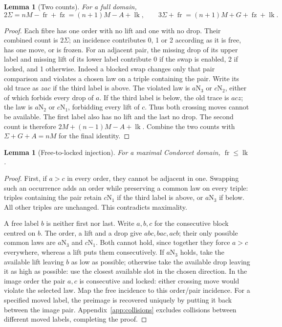 \documentclass[11pt,letterpaper]{article}
\newtheorem{lemma}[theorem]{Lemma}
\theoremstyle{definition}
\newcommand{\Sig}{\Sigma}
\newcommand{\fr}{\operatorname{fr}}
\newcommand{\fz}{\operatorname{fz}}
\newcommand{\lk}{\operatorname{lk}}
\newcommand{\N}[2]{#1\mathrm N_{#2}}
\begin{document}
\begin{lemma}[Two counts]\label{lem:counts}
For a full domain,
\begin{equation}\label{eq:movecounts}
 2\Sig=nM-\fr+\fz=(n+1)M-A+\lk,
 \qquad 3\Sig+\fr=(n+1)M+G+\fz+\lk.
\end{equation}
\end{lemma}
\begin{proof}
Each fibre has one order with no lift and one with no drop. Their
combined count is \(2\Sig\); an incidence contributes 0, 1 or 2
according as it is free, has one move, or is frozen.
For an adjacent pair, the missing drop of its upper label and missing
lift of its lower label contribute 0 if the swap is enabled, 2 if
locked, and 1 otherwise. Indeed a blocked swap changes only that pair
comparison and violates a chosen law on a triple containing the pair.
Write its old trace as \(zac\) if the third label is above. The
violated law is \(\N a3\) or \(\N c2\), either of which forbids
every drop of \(a\). If the third label is below, the old trace is
\(acz\); the law is \(\N a2\) or \(\N c1\), forbidding every
lift of \(c\). Thus both crossing moves cannot be available.
The first label also has no lift and the last no drop. The second
count is therefore \(2M+(n-1)M-A+\lk\). Combine the two counts
with \(\Sig+G+A=nM\) for the final identity.
\end{proof}

\begin{lemma}[Free-to-locked injection]\label{lem:injection}
For a maximal Condorcet domain, \(\fr\leq\lk\).
\end{lemma}
\begin{proof}
First, if \(a>c\) in every order, they cannot be adjacent in one.
Swapping such an occurrence adds an order while preserving a common
law on every triple: triples containing the pair retain \(\N c1\)
if the third label is above, or \(\N a3\) if below. All other triples
are unchanged. This contradicts maximality.

A free label \(b\) is neither first nor last. Write \(a,b,c\) for the
consecutive block centred on \(b\). The order, a lift
and a drop give \(abc,bac,acb\); their only possible common laws
are \(\N a3\) and \(\N c1\). Both cannot hold, since together
they force \(a>c\) everywhere, whereas a lift puts them consecutively.
If \(\N a3\) holds, take the available lift leaving \(b\) as low
as possible; otherwise take the available drop leaving it as high
as possible: use the closest available slot in the chosen direction.
In the image order the pair
\(a,c\) is consecutive and locked: either crossing move would violate
the selected law. Map the free incidence to this order/pair incidence.
For a specified moved label, the preimage is recovered uniquely by
putting it back between the image pair. Appendix~\ref{app:collisions}
excludes collisions between different moved labels, completing the proof.
\end{proof}
\end{document}
